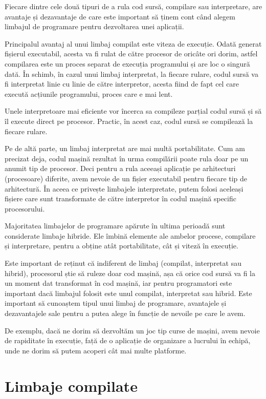 Fiecare dintre cele două tipuri de a rula cod sursă, compilare sau interpretare, are avantaje și dezavantaje de care este important să ținem cont când alegem limbajul de programare pentru dezvoltarea unei aplicații.

Principalul avantaj al unui limbaj compilat este viteza de execuție.
Odată generat fișierul executabil, acesta va fi rulat de către procesor de oricâte ori dorim, astfel compilarea este un proces separat de execuția programului și are loc o singură dată.
În schimb, în cazul unui limbaj interpretat, la fiecare rulare, codul sursă va fi interpretat linie cu linie de către interpretor, acesta fiind de fapt cel care execută acțiunile programului, proces care e mai lent.

Unele interpretoare mai eficiente vor încerca sa compileze parțial codul sursă și să îl execute direct pe procesor.
Practic, în acest caz, codul sursă se compilează la fiecare rulare.

Pe de altă parte, un limbaj interpretat are mai multă portabilitate.
Cum am precizat deja, codul mașină rezultat în urma compilării poate rula doar pe un anumit tip de procesor.
Deci pentru a rula aceeași aplicație pe arhitecturi (procesoare) diferite, avem nevoie de un fișier executabil pentru fiecare tip de arhitectură.
În aceea ce privește limbajele interpretate, putem folosi aceleași fișiere care sunt transformate de către interpretor în codul mașină specific procesorului.

Majoritatea limbajelor de programare apărute în ultima perioadă sunt considerate limbaje hibride.
Ele îmbină elemente ale ambelor procese, compilare și interpretare, pentru a obține atât portabilitate, cât și viteză în execuție.

Este important de reținut că indiferent de limbaj (compilat, interpretat sau hibrid), procesorul știe să ruleze doar cod mașină, așa că orice cod sursă va fi la un moment dat transformat în cod mașină, iar pentru programatori este important dacă limbajul folosit este unul compilat, interpretat sau hibrid.
Este important să cunoaștem tipul unui limbaj de programare, avantajele și dezavantajele sale pentru a putea alege în funcție de nevoile pe care le avem.

De exemplu, dacă ne dorim să dezvoltăm un joc tip curse de mașini, avem nevoie de rapiditate în execuție, față de o aplicație de organizare a lucrului în echipă, unde ne dorim să putem acoperi cât mai multe platforme.

\section{Limbaje compilate}
\label{sec:appdev:compiled-lang}

